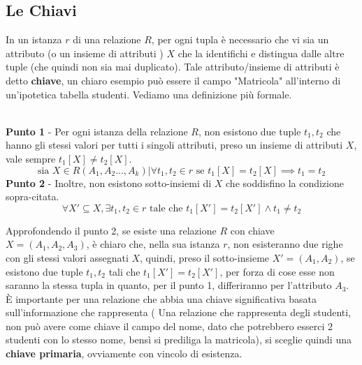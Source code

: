 \documentclass[12pt, letterpaper]{article}
\begin{document}
\subsection{Le Chiavi}
In un istanza \(r\) di una relazione \(R\), per ogni tupla è necessario che vi sia un attributo (o un insieme di attributi ) \(X\)
che la identifichi e distingua dalle altre tuple (che quindi non sia mai duplicato). Tale attributo/insieme di attributi è detto
\textbf{chiave}, un chiaro esempio può essere il campo "Matricola" all'interno di un'ipotetica tabella studenti.
Vediamo una definizione più formale.
\begin{theorem}
    \hphantom{.}\\\textbf{ Punto 1 }- Per ogni istanza della relazione \(R\), non esistono due tuple \(t_1,t_2\) che hanno gli stessi valori
    per tutti i singoli attributi, preso un insieme di attributi \(X\), vale sempre \(t_1[X]\ne t_2[X]\).
    \begin{equation}
        \text{sia }X\in R(A_1,A_2...,A_k) | \forall t_1,t_2 \in r \text{ se }t_1[X]=t_2[X] \implies t_1=t_2
    \end{equation}
    \textbf{ Punto 2 }- Inoltre, non esistono sotto-insiemi di \(X\) che soddisfino la condizione sopra-citata.
    \begin{equation}
        \forall X'\subseteq X, \exists t_1,t_2 \in r \text{ tale che } t_1[X']=t_2[X'] \land t_1 \ne t_2
    \end{equation}
\end{theorem}
Approfondendo il punto 2, se esiste una relazione \(R\) con chiave \(X=(A_1,A_2,A_3)\), è chiaro che, nella 
sua istanza \(r\), non esisteranno due righe con gli stessi valori assegnati \(X\), quindi, preso il sotto-insieme
\(X'=(A_1,A_2)\), se esistono due tuple \(t_1,t_2\) tali che \(t_1[X']=t_2[X']\), per forza di cose esse non 
saranno la stessa tupla in quanto, per il punto 1, differiranno per l'attributo \(A_3\).
È importante per una relazione che abbia una chiave significativa basata sull'informazione che rappresenta
( Una relazione che rappresenta degli studenti, non può avere come chiave il campo del nome, dato che potrebbero 
esserci 2 studenti con lo stesso nome, bensì si prediliga la matricola), si sceglie quindi una \textbf{chiave primaria},
ovviamente con vincolo di esistenza.
\end{document}
